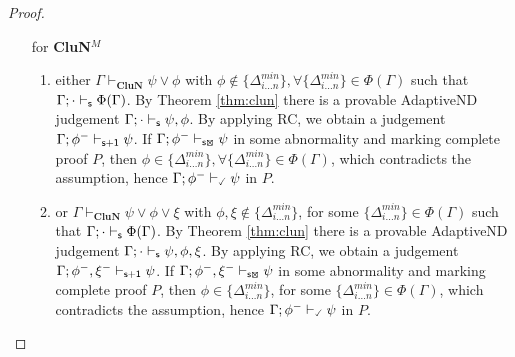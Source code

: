 \documentclass[]{article}
\newcommand{\Turn}[2]
    { {#1}\vdash_{\textbf{\sf s}}  {#2}}
\newcommand{\TurnNext}[2]
        { {#1}\vdash_{\textbf{\sf s+1}}  {#2}}
\newcommand{\TurnMarked}[2]
    { {#1}\vdash_{\textbf{\sf s\XBox}}  {#2}}
\newcommand{\TurnChecked}[2]
    { {#1}\vdash_{\textbf{\sf \checked}}  {#2}}
\begin{document}
\begin{proof}
\begin{itemize}
\begin{itemize}
  \item[for \textbf{CluN}$^{M}$]

\begin{enumerate}
\item either $\Gamma\vdash_{\mathbf{CluN}}\psi\vee \phi$ with $\phi\notin \{\Delta^{min}_{i\dots n}\}, \forall \{\Delta^{min}_{i\dots n}\}\in \Phi(\Gamma)$ such that $\Turn{\Gamma;\cdot}{\Phi(\Gamma)}$. By Theorem \ref{thm:clun} there is a provable {\sf AdaptiveND} judgement $\Turn{\Gamma;\cdot}{\psi,\phi}$. By applying {\sf RC}, we obtain a judgement $\TurnNext{\Gamma;\phi^{-}}{\psi}$. If $\TurnMarked{\Gamma;\phi^{-}}{\psi}$ in some abnormality and marking complete proof $P$, then $\phi\in \{\Delta^{min}_{i\dots n}\}, \forall \{\Delta^{min}_{i\dots n}\}\in \Phi(\Gamma)$, which contradicts the assumption, hence $\TurnChecked{\Gamma;\phi^{-}}{\psi}$ in $P$.
\item or $\Gamma\vdash_{\mathbf{CluN}}\psi\vee \phi \vee \xi$ with $\phi, \xi\notin \{\Delta^{min}_{i\dots n}\}$, for some $\{\Delta^{min}_{i\dots n}\}\in \Phi(\Gamma)$ such that $\Turn{\Gamma;\cdot}{\Phi(\Gamma)}$. By Theorem \ref{thm:clun} there is a provable {\sf AdaptiveND} judgement $\Turn{\Gamma;\cdot}{\psi,\phi,\xi}$. By applying {\sf RC}, we obtain a judgement $\TurnNext{\Gamma;\phi^{-},\xi^{-}}{\psi}$. If $\TurnMarked{\Gamma;\phi^{-},\xi^{-}}{\psi}$ in some abnormality and marking complete proof $P$, then $\phi\in \{\Delta^{min}_{i\dots n}\}$, for some $\{\Delta^{min}_{i\dots n}\}\in \Phi(\Gamma)$, which contradicts the assumption, hence $\TurnChecked{\Gamma;\phi^{-}}{\psi}$ in $P$.
\end{enumerate}
\end{itemize}

\end{itemize}
\end{proof}
\end{document}
